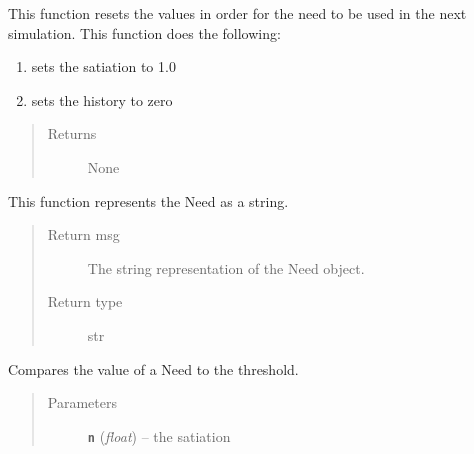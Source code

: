 \documentclass[letterpaper,10pt,english]{sphinxmanual}
\begin{document}
\begin{fulllineitems}
\begin{fulllineitems}
\end{fulllineitems}


\begin{fulllineitems}
\label{need:need.Need.reset}
This function resets the values in order for the need to be used in the next simulation. This function         does the following:
\begin{enumerate}
\item {} 
sets the satiation to 1.0

\item {} 
sets the history to zero

\end{enumerate}
\begin{quote}\begin{description}
\item[{Returns}] \leavevmode
None

\end{description}\end{quote}

\end{fulllineitems}


\begin{fulllineitems}
\label{need:need.Need.toString}
This function represents the Need as a string.
\begin{quote}\begin{description}
\item[{Return msg}] \leavevmode
The string representation of the Need object.

\item[{Return type}] \leavevmode
str

\end{description}\end{quote}

\end{fulllineitems}


\begin{fulllineitems}
\label{need:need.Need.under_threshold}
Compares the value of a Need to the threshold.
\begin{quote}\begin{description}
\item[{Parameters}] \leavevmode
\textbf{\texttt{n}} (\emph{float}) -- the satiation


\end{description}
\end{quote}
\end{fulllineitems}
\end{fulllineitems}
\end{document}

